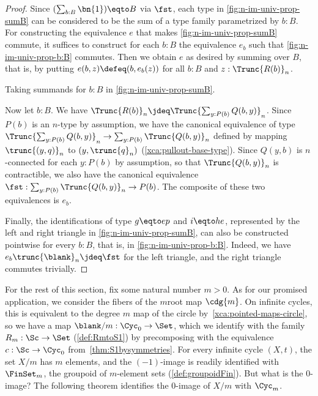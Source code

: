 \begin{proof}
Since $(\sum_{b:B}\bn{1}) \eqto B$ via $\fst$, 
each type in \cref{fig:n-im-univ-prop-sumB}
can be considered to be the sum of a type family parametrized by $b:B$.
For constructing the equivalence $e$ that makes
\cref{fig:n-im-univ-prop-sumB} commute, it suffices to
construct for each $b:B$ the equivalence $e_b$ such that
\cref{fig:n-im-univ-prop-b:B} commutes.
Then we obtain $e$ as desired by summing over $B$, that is,
by putting $e(b,z) \defeq (b,e_b(z))$ for all $b:B$ and $z:\Trunc{R(b)}_n$.

\begin{marginfigure}
  \noindent{}
\caption{Taking summands for $b:B$ in \cref{fig:n-im-univ-prop-sumB}.}
\label{fig:n-im-univ-prop-b:B}
\end{marginfigure}

Now let $b:B$. We have $\Trunc{R(b)}_n \jdeq \Trunc{\sum_{y:P(b)} Q(b,y)}_n$.
Since $P(b)$ is an $n$-type by assumption, we have the canonical equivalence 
of type $\Trunc{\sum_{y:P(b)} Q(b,y)}_n\to\sum_{y:P(b)}\Trunc{Q(b,y)}_n$ defined 
by mapping $\trunc{(y,q)}_n$ to $(y,\trunc{q}_n)$ 
(\cf \cref{xca:pullout-base-type}).
Since $Q(y,b)$ is $n$-connected for each $y:P(b)$ by assumption,
so that $\Trunc{Q(b,y)}_n$ is contractible,
we also have the canonical equivalence 
$\fst: \sum_{y:P(b)}\Trunc{Q(b,y)}_n \to P(b)$.
The composite of these two equivalences is $e_b$. 

Finally, the identifications of type $g\eqto ep$ and $i\eqto he$,
represented by the left and right triangle in \cref{fig:n-im-univ-prop-sumB},
can also be constructed pointwise for every $b:B$, that is,
in \cref{fig:n-im-univ-prop-b:B}. Indeed, we have 
$e_b \trunc{\blank}_n \jdeq \fst$ for the left triangle, 
and the right triangle commutes trivially.
\end{proof}

For the rest of this section, fix some natural number $m>0$. As for our
promised application, we consider the fibers of the $m$\th root map $\cdg{m}$.
On infinite cycles, this is equivalent to the degree $m$ map
of the circle by~\cref{xca:pointed-maps-circle}, so we have a map
$\blank/m : \Cyc_0 \to \Set$, which we identify with the family
$R_m : \Sc \to \Set$ (\cref{def:RmtoS1}) by precomposing with the equivalence
$c : \Sc \to \Cyc_0$ from~\cref{thm:S1bysymmetries}.
For every infinite cycle $(X,t)$, the set $X/m$ has $m$ elements,
and the $(-1)$-image is readily identified with $\FinSet_m$, 
the groupoid of $m$-element sets (\cref{def:groupoidFin}).
But what is the $0$-image? The following theorem identifies
the $0$-image of $X/m$ with $\Cyc_m$.

